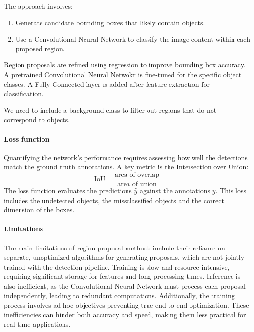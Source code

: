 The approach involves: 
\begin{enumerate}
    \item Generate candidate bounding boxes that likely contain objects.
    \item Use a Convolutional Neural Network to classify the image content within each proposed region.
\end{enumerate}
Region proposals are refined using regression to improve bounding box accuracy.
A pretrained Convolutional Neural Netwokr is fine-tuned for the specific object classes. 
A Fully Connected layer is added after feature extraction for classification.

We need to include a background class to filter out regions that do not correspond to objects.

\paragraph*{Loss function}
Quantifying the network's performance requires assessing how well the detections match the ground truth annotations. 
A key metric is the Intersection over Union:
\[\text{IoU}=\dfrac{\text{area of overlap}}{\text{area of union}}\]
The loss function evaluates the predictions $\hat{y}$ against the annotations $y$. 
This loss includes the undetected objects, the missclassified objects and the correct dimension of the boxes. 

\paragraph*{Limitations}
The main limitations of region proposal methods include their reliance on separate, unoptimized algorithms for generating proposals, which are not jointly trained with the detection pipeline.
Training is slow and resource-intensive, requiring significant storage for features and long processing times. 
Inference is also inefficient, as the Convolutional Neural Network must process each proposal independently, leading to redundant computations. 
Additionally, the training process involves ad-hoc objectives preventing true end-to-end optimization. 
These inefficiencies can hinder both accuracy and speed, making them less practical for real-time applications.


